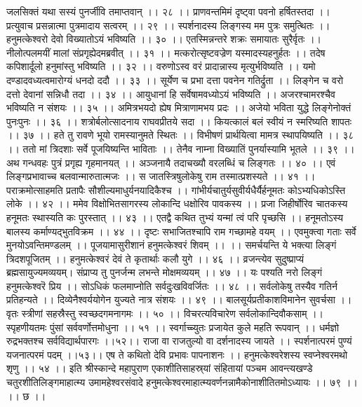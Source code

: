 जलसिक्तं यथा सस्यं पुनर्जीवि तमाप्तवान् ।। २८ ।।
प्राणवन्तमिमं दृष्ट्वा पवनो हर्षितस्तदा ।।
प्रत्युवाच प्रसन्नात्मा पुत्रमादाय सत्वरम् ।। २९ ।।
स्पर्शनादस्य लिङ्गस्य मम पुत्रः समुत्थितः ।।
हनुमत्केश्वरो देवो विख्यातोऽयं भविष्यति ।। ३० ।।
एतस्मिन्नन्तरे शक्रः समायातः सुरैर्वृतः ।।
नीलोत्पलमयीं मालां संप्रगृह्येदमब्रवीत् ।। ३१ ।।
मत्करोत्सृष्टवज्रेण यस्मादस्यहनुर्हतः ।।
तदेष कपिशार्दूलो हनुमांस्तु भविष्यति ।। ३२ ।।
वरुणोऽस्व वरं प्रादान्नास्य मृत्युर्भविष्यति ।।
यमो दण्डादवध्यत्वमारोग्यं धनदो ददौ ।। ३३ ।।
सूर्येण च प्रभा दत्ता पवनेन गतिर्द्रुता ।।
लिङ्गेन च वरो दत्तो देवानां सन्निधौ तदा ।। ३४ ।।
आयुधानां हि सर्वेषामवध्योऽयं भविष्यति ।।
अजरश्चामरश्चैव भविष्यति न संशयः ।। ३५ ।।
अमित्रभयदो ह्येष मित्राणामभय प्रदः ।।
अजेयो भविता युद्धे लिङ्गेनोक्तं पुनःपुनः ।। ३६ ।।
शत्रोर्बलोत्सादनाय राघवप्रीतये सदा ।।
कियत्कालं बलं स्वीयं न स्मरिष्यति शापतः ।। ३७ ।।
हते तु रावणे भूयो रामस्यानुमते स्थितः ।।
विभीषणं प्रार्थयित्वा मामत्र स्थापयिष्यति ।। ३८ ।।
ततो मां त्रिदशाः सर्वे पूजयिष्यन्ति भाविताः ।।
तेनैव नाम्ना विख्यातिं पुनर्यास्यामि भूतले ।। ३९ ।।
अथ गन्धवहः पुत्रं प्रगृह्य गृहमानयत् ।।
अञ्जनायै तदाचख्यौ वरलब्धिं च लिङ्गतः ।। ४० ।।
एवं लिङ्गप्रभावाच्च बलवान्मारुतात्मजः ।।
स जातस्त्रिषुलोकेषु राम तस्मात्प्रशस्यते ।। ४१ ।।
पराक्रमोत्साहमति प्रतापैः सौशील्यमाधुर्यनयादिकैश्च ।।
गांभीर्यचातुर्यसुवीर्यधैर्यैर्हनूमतः कोऽभ्यधिकोऽस्ति लोके ।। ४२ ।।
ममेव विक्षोभितसागरस्य लोकान्दि धक्षोरिव पावकस्य ।।
प्रजा जिहीर्षोरिव चातकस्य हनूमतः स्थास्यति कः पुरस्तात् ।। ४३ ।।
एतद्वै कथित तुभ्यं यन्मां त्वं परि पृच्छसि ।।
हनूमतोऽस्य बालस्य कर्माण्यद्भुतविक्रम ।। ४४ ।।
दृष्टः सभाजितश्चापि राम गच्छामहे वयम् ।।
एवमुक्त्वा गताः सर्वे मुनयोऽवन्तिमण्डलम् ।।
पूजयामासुरीशानं हनुमत्केश्वरं शिवम् ।। ।।
समर्चयन्ति ये भक्त्या लिङ्गं त्रिदशपूजितम् ।।
हनुमत्केश्वरं देवं ते कृतार्थाः कलौ युगे ।। ४६ ।।
व्रजन्त्येव सुदुष्प्राप्यं ब्रह्मसायुज्यमव्ययम्।
संप्राप्य तु पुनर्जन्म लभन्ते मोक्षमव्ययम् ।। ४७ ।।
यः पश्यति नरो लिङ्गं हनुमत्केश्वरॆ प्रिय ।।
सोऽधिकं फलमाप्नोति सर्वदुःखविवर्जितः ।। ४८ ।।
सर्वलोकेषु तस्यैव गतिर्न प्रतिहन्यते ।।
दिव्येनैश्वर्ययोगेन युज्यते नात्र संशयः ।। ४९ ।।
बालसूर्यप्रतीकाशविमानेन सुवर्चसा ।।
वृतः स्त्रीणां सहस्रैस्तु स्वच्छदगमनागमः ।। ५० ।।
विचरत्यविचारेण सर्वलोकान्दिवौकसाम् ।।
स्पृहणीयतमः पुंसां सर्ववर्णोत्तमोधुना ।। ५१ ।।
स्वर्गाच्च्युतः प्रजायेत कुले महति रूपवान् ।।
धर्मज्ञो रुद्रभक्तश्च सर्वविद्यार्थपारगः ।।५२।।
राजा वा राजतुल्यो वा दर्शनादस्य जायते ।।
स्पर्शनात्परमं पुण्यं यजनात्परमं पदम् ।।५३।।
एष ते कथितो देवि प्रभावः पापनाशनः ।।
हनुमत्केश्वरेशस्य स्वप्नेश्वरमथो शृणु ।। ५४ ।।
इति श्रीस्कान्दे महापुराण एकाशीतिसाहस्र्यां संहितायां पञ्चम आवन्त्यखण्डे चतुरशीतिलिङ्गमाहात्म्य उमामहेश्वरसंवादे हनुमत्केश्वरमाहात्म्यवर्णनन्नामैकोनाशीतितमोऽध्यायः ।। ७९ ।। ।। छ ।।

